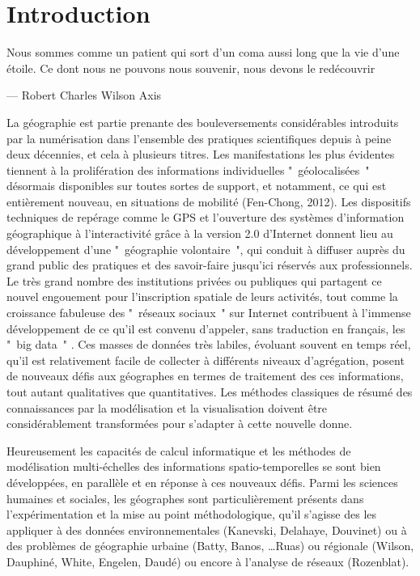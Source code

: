 
\graphicspath{{Figure1/}}



\chapter*{Introduction}

\epigraph{Nous sommes comme un patient qui sort d'un coma aussi long que la vie d'une étoile.
Ce dont nous ne pouvons nous souvenir, nous devons le redécouvrir }{---  \textup{Robert Charles Wilson}  Axis}

La géographie est partie prenante des bouleversements considérables introduits par la numérisation dans l’ensemble des pratiques scientifiques depuis à peine deux décennies, et cela à plusieurs titres. Les manifestations les plus évidentes tiennent à la prolifération des informations individuelles " géolocalisées " désormais disponibles sur toutes sortes de support, et notamment, ce qui est entièrement nouveau, en situations de mobilité 	 (Fen-Chong, 2012).  Les dispositifs techniques de repérage comme le GPS et l’ouverture des systèmes d’information géographique à l’interactivité grâce à la version 2.0 d’Internet donnent lieu au développement d’une " géographie volontaire ", qui conduit à diffuser auprès du grand public des pratiques et des savoir-faire jusqu’ici réservés aux professionnels. Le très grand nombre des institutions privées ou publiques qui partagent ce nouvel engouement pour l’inscription spatiale de leurs activités, tout comme la croissance fabuleuse des " réseaux sociaux " sur Internet  contribuent à l’immense développement de ce qu’il est convenu d’appeler, sans traduction en français, les " big data " . Ces masses de données très labiles, évoluant souvent en temps réel, qu’il est relativement facile de collecter à différents niveaux d’agrégation, posent de nouveaux défis aux géographes en termes de traitement des ces informations, tout autant qualitatives que quantitatives. Les méthodes classiques de résumé des connaissances par la modélisation et la visualisation doivent être considérablement transformées pour s’adapter à cette nouvelle donne. 

Heureusement les capacités de calcul informatique et les méthodes de modélisation multi-échelles des informations spatio-temporelles se sont bien développées, en parallèle et en réponse à ces nouveaux défis. Parmi les sciences humaines et sociales, les géographes sont particulièrement présents dans l’expérimentation et la mise au point méthodologique, qu’il s’agisse des les appliquer à des données environnementales (Kanevski, Delahaye, Douvinet) ou à des problèmes de géographie urbaine (Batty, Banos, …Ruas) ou régionale (Wilson, Dauphiné, White, Engelen, Daudé) ou encore à l’analyse de réseaux (Rozenblat). 

